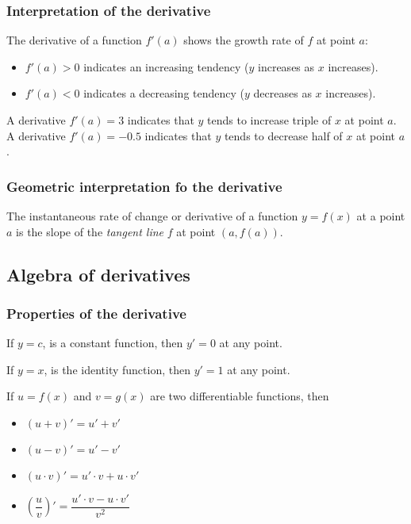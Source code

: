 \begin{frame}
\frametitle{Interpretation of the derivative}
The derivative of a function $f'(a)$ shows the growth rate of $f$ at point $a$:
\begin{itemize}
\item $f'(a)>0$ indicates an increasing tendency ($y$ increases as $x$ increases).
\item $f'(a)<0$ indicates a decreasing tendency ($y$ decreases as $x$ increases).
\end{itemize}

 A derivative $f'(a)=3$ indicates that $y$ tends to increase triple of $x$ at point $a$. 
 A derivative $f'(a)=-0.5$ indicates that $y$ tends to decrease half of $x$ at point $a$. 
\end{frame}


\begin{frame}
\frametitle{Geometric interpretation fo the derivative}
The instantaneous rate of change or derivative of a function $y=f(x)$ at a point $a$ is the slope of the \emph{tangent line} $f$ at point $(a,f(a))$.
\begin{center}

\end{center}
\end{frame}



\subsection{Algebra of derivatives}
\begin{frame}
\frametitle{Properties of the derivative}
If $y=c$, is a constant function, then $y'=0$ at any point.

If $y=x$, is the identity function, then  $y'=1$ at any point.

If $u=f(x)$ and $v=g(x)$ are two differentiable functions, then 
\begin{itemize}
\item $(u+v)'=u'+v'$
\item $(u-v)'=u'-v'$
\item $(u\cdot v)'=u'\cdot v+ u\cdot v'$
\item $\left(\dfrac{u}{v}\right)'=\dfrac{u'\cdot v-u\cdot v'}{v^2}$
\end{itemize}
\end{frame}


